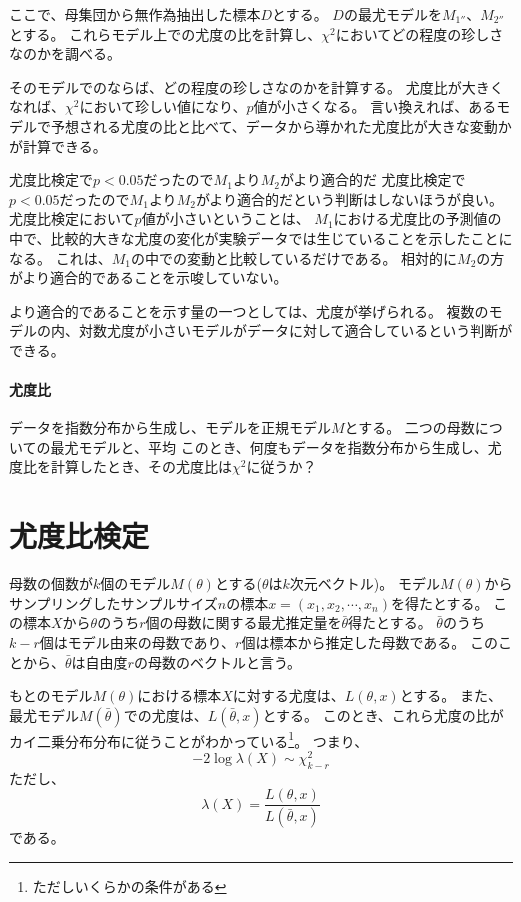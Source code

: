 ここで、母集団から無作為抽出した標本$D$とする。
$D$の最尤モデルを$M_{1''}$、$M_{2''}$とする。
これらモデル上での尤度の比を計算し、$\chi^2$においてどの程度の珍しさなのかを調べる。


そのモデルでのならば、どの程度の珍しさなのかを計算する。
尤度比が大きくなれば、$\chi^2$において珍しい値になり、$p$値が小さくなる。
言い換えれば、あるモデルで予想される尤度の比と比べて、データから導かれた尤度比が大きな変動かが計算できる。
\fi

\begin{SMbox}{尤度比検定で$p<0.05$だったので$M_1$より$M_2$がより適合的だ}
 尤度比検定で$p<0.05$だったので$M_1$より$M_2$がより適合的だという判断はしないほうが良い。
 尤度比検定において$p$値が小さいということは、
 $M_1$における尤度比の予測値の中で、比較的大きな尤度の変化が実験データでは生じていることを示したことになる。
 これは、$M_1$の中での変動と比較しているだけである。
 相対的に$M_2$の方がより適合的であることを示唆していない。

 より適合的であることを示す量の一つとしては、尤度が挙げられる。
 複数のモデルの内、対数尤度が小さいモデルがデータに対して適合しているという判断ができる。
\end{SMbox}



\paragraph{尤度比}
データを指数分布から生成し、モデルを正規モデル$M$とする。
二つの母数についての最尤モデルと、平均
このとき、何度もデータを指数分布から生成し、尤度比を計算したとき、その尤度比は$\chi^2$に従うか？
\fi

\section{尤度比検定}
母数の個数が$k$個のモデル$M(\theta)$とする($\theta$は$k$次元ベクトル)。
モデル$M(\theta)$からサンプリングしたサンプルサイズ$n$の標本$x=(x_1,x_2,\cdots,x_n)$を得たとする。
この標本$X$から$\theta$のうち$r$個の母数に関する最尤推定量を$\bar{\theta}$得たとする。
$\bar{\theta}$のうち$k-r$個はモデル由来の母数であり、$r$個は標本から推定した母数である。
このことから、$\bar{\theta}$は自由度$r$の母数のベクトルと言う。

もとのモデル$M(\theta)$における標本$X$に対する尤度は、$L(\theta,x)$とする。
また、最尤モデル$M(\bar{\theta})$での尤度は、$L(\bar{\theta},x)$とする。
このとき、これら尤度の比がカイ二乗分布分布に従うことがわかっている\footnote{ただしいくらかの条件がある}。
つまり、
\begin{equation*}
    -2\log\lambda(X)\sim \chi^2_{k-r}
\end{equation*}
ただし、
\begin{equation*}
    \lambda(X) = \frac{L(\theta,x)}{L(\bar{\theta},x)} 
\end{equation*}
である。


